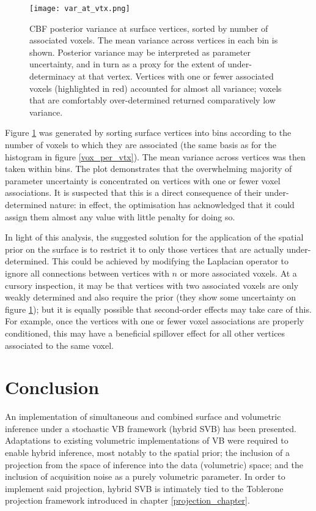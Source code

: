 \begin{figure}[H]
\centering
\texttt{[image: var\_at\_vtx.png]}
\caption{CBF posterior variance at surface vertices, sorted by number of associated voxels. The mean variance across vertices in each bin is shown. Posterior variance may be interpreted as parameter uncertainty, and in turn as a proxy for the extent of under-determinacy at that vertex. Vertices with one or fewer associated voxels (highlighted in red) accounted for almost all variance; voxels that are comfortably over-determined returned comparatively low variance.}
\label{var_at_vtx} 
\end{figure}

Figure \ref{var_at_vtx} was generated by sorting surface vertices into bins according to the number of voxels to which they are associated (the same basis as for the histogram in figure \ref{vox_per_vtx}). The mean variance across vertices was then taken within bins. The plot demonstrates that the overwhelming majority of parameter uncertainty is concentrated on vertices with one or fewer voxel associations. It is suspected that this is a direct consequence of their under-determined nature: in effect, the optimisation has acknowledged that it could assign them almost any value with little penalty for doing so. 

In light of this analysis, the suggested solution for the application of the spatial prior on the surface is to restrict it to only those vertices that are actually under-determined. This could be achieved by modifying the Laplacian operator to ignore all connections between vertices with $n$ or more associated voxels. At a cursory inspection, it may be that vertices with two associated voxels are only weakly determined and also require the prior (they show some uncertainty on figure \ref{var_at_vtx}); but it is equally possible that second-order effects may take care of this. For example, once the vertices with one or fewer voxel associations are properly conditioned, this may have a beneficial spillover effect for all other vertices associated to the same voxel. 

\section{Conclusion} 

An implementation of simultaneous and combined surface and volumetric inference under a stochastic VB framework (hybrid SVB) has been presented. Adaptations to existing volumetric implementations of VB were required to enable hybrid inference, most notably to the spatial prior; the inclusion of a projection from the space of inference into the data (volumetric) space; and the inclusion of acquisition noise as a purely volumetric parameter. In order to implement said projection, hybrid SVB is intimately tied to the Toblerone projection framework introduced in chapter \ref{projection_chapter}. 

